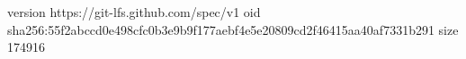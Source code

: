 version https://git-lfs.github.com/spec/v1
oid sha256:55f2abccd0e498cfc0b3e9b9f177aebf4e5e20809cd2f46415aa40af7331b291
size 174916
